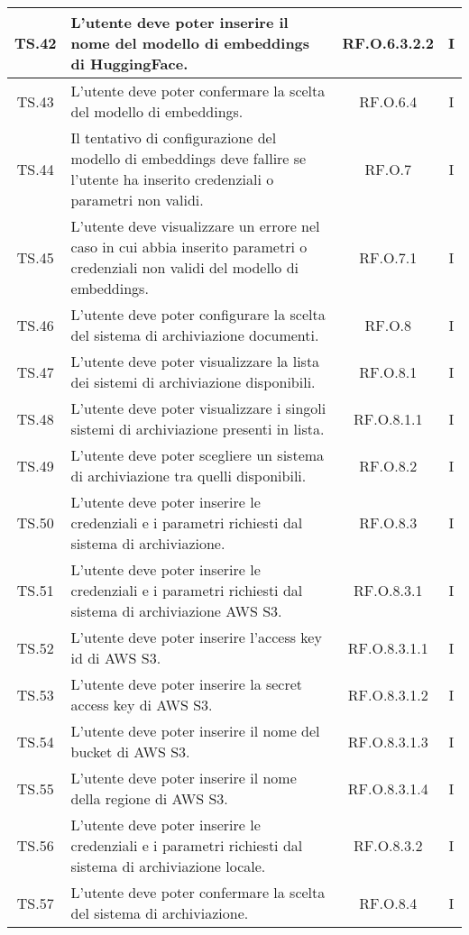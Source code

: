 {{{{{{{{{{\begin{xltabular}{\textwidth}{|c|X|c|c|}
    \hline
    TS.42 & L’utente deve poter inserire il nome del modello di embeddings di HuggingFace. & RF.O.6.3.2.2 & I \\
    \hline
    TS.43 & L’utente deve poter confermare la scelta del modello di embeddings. & RF.O.6.4 & I \\
    \hline
    TS.44 & Il tentativo di configurazione del modello di embeddings deve fallire se l’utente ha inserito credenziali o parametri non validi. & RF.O.7 & I \\
    \hline
    TS.45 & L’utente deve visualizzare un errore nel caso in cui abbia inserito parametri o credenziali non validi del modello di embeddings. & RF.O.7.1 & I \\
    \hline
    TS.46 & L’utente deve poter configurare la scelta del sistema di archiviazione documenti. & RF.O.8 & I \\
    \hline
    TS.47 & L’utente deve poter visualizzare la lista dei sistemi di archiviazione disponibili. & RF.O.8.1 & I \\
    \hline
    TS.48 & L’utente deve poter visualizzare i singoli sistemi di archiviazione presenti in lista. & RF.O.8.1.1 & I \\
    \hline
    TS.49 & L’utente deve poter scegliere un sistema di archiviazione tra quelli disponibili. & RF.O.8.2 & I \\
    \hline
    TS.50 & L’utente deve poter inserire le credenziali e i parametri richiesti dal sistema di archiviazione. & RF.O.8.3 & I \\
    \hline
    TS.51 & L’utente deve poter inserire le credenziali e i parametri richiesti dal sistema di archiviazione AWS S3. & RF.O.8.3.1 & I \\
    \hline
    TS.52 & L’utente deve poter inserire l’access key id di AWS S3. & RF.O.8.3.1.1 & I \\
    \hline
    TS.53 & L’utente deve poter inserire la secret access key di AWS S3. & RF.O.8.3.1.2 & I \\
    \hline
    TS.54 & L’utente deve poter inserire il nome del bucket di AWS S3. & RF.O.8.3.1.3 & I \\
    \hline
    TS.55 & L’utente deve poter inserire il nome della regione di AWS S3. & RF.O.8.3.1.4 & I \\
    \hline
    TS.56 & L’utente deve poter inserire le credenziali e i parametri richiesti dal sistema di archiviazione locale. & RF.O.8.3.2 & I \\
    \hline
    TS.57 & L’utente deve poter confermare la scelta del sistema di archiviazione. & RF.O.8.4 & I \\

\end{xltabular}}}}}}}}}}}
